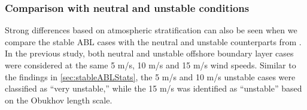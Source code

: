 



\subsubsection{Comparison with neutral and unstable conditions}

Strong differences based on atmospheric stratification can also be
seen when we compare the stable ABL cases with the neutral and
unstable counterparts from \cite{cheung2020large}.  In the previous
study, both neutral and unstable offshore boundary layer cases were
considered at the same 5 m/s, 10 m/s and 15 m/s wind speeds.  Similar
to the findings in \ref{sec:stableABLStats}, the 5 m/s and 10 m/s
unstable cases were classified as ``very unstable,'' while the 15 m/s
was identified as ``unstable'' based on the Obukhov length scale.

